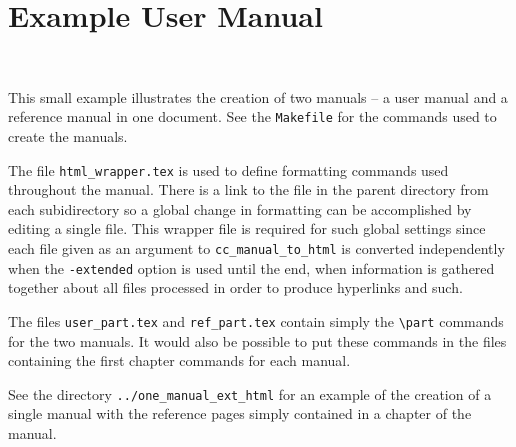 
\chapter{Example User Manual}
\\

This small example illustrates the creation of two manuals -- a user manual
and a reference manual in one document.  See the \texttt{Makefile} for the
commands used to create the manuals.

The file \texttt{html\_wrapper.tex} is used to define formatting commands
used throughout the manual.  There is a link to the file in the parent
directory from each subidirectory so a global change in formatting can
be accomplished by editing a single file.  This wrapper file is
required for such global settings since each file given as an argument to
\texttt{cc\_manual\_to\_html} is converted independently when the
\texttt{-extended} option is used until the end, when information is gathered 
together about all files processed in order to produce hyperlinks and such. 

The files \texttt{user\_part.tex} and \texttt{ref\_part.tex} contain simply
the \verb+\part+ commands for the two manuals.  It would also be possible to
put these commands in the files containing the first chapter commands for each
manual.

See the directory \texttt{../one\_manual\_ext\_html} for an
example of the creation of a single manual with the reference pages
simply contained in a chapter of the manual.
